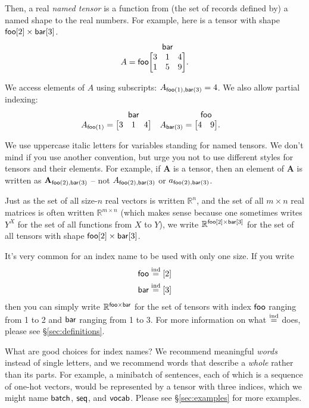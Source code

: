 \documentclass{article}
\makeatletter
\newcommand{\nmatrix}[3]{\name{#1}\begin{array}[b]{@{}c@{}}\name{#2}\\\begin{bmatrix}#3\end{bmatrix}\end{array}}
\makeatother
\begin{document}
Then, a real \emph{named tensor} is a function from (the set of records defined by) a named shape to the real numbers. For example, here is a tensor with shape $\mathsf{foo}[2] \times \mathsf{bar}[3]$.
\begin{equation*}
A = \nmatrix{foo}{bar}{
  3 & 1 & 4 \\
  1 & 5 & 9
}.
\end{equation*}

We access elements of $A$ using subscripts: $A_{\mathsf{foo}(1), \mathsf{bar}(3)} = 4$.
We also allow partial indexing:
\begin{align*}
A_{\nidx{foo}{1}} &= \nmatrix{}{bar}{
  3 & 1 & 4
}
&
A_{\nidx{bar}{3}} &= \nmatrix{}{foo}{
  4 & 9
}.
\end{align*}

We use uppercase italic letters for variables standing for named tensors. We don't mind if you use another convention, but urge you not to use different styles for tensors and their elements. For example, if $\mathbf{A}$ is a tensor, then an element of $\mathbf{A}$ is written as $\mathbf{A}_{\mathsf{foo}(2), \mathsf{bar}(3)}$ -- 
not $A_{\mathsf{foo}(2),\mathsf{bar}(3)}$ or $a_{\mathsf{foo}(2),\mathsf{bar}(3)}$.

Just as the set of all size-$n$ real vectors is written $\mathbb{R}^n$, and the set of all $m\times n$ real matrices is often written $\mathbb{R}^{m \times n}$ (which makes sense because one sometimes writes $Y^X$ for the set of all functions from $X$ to $Y$), we write $\mathbb{R}^{\mathsf{foo}[2] \times \mathsf{bar}[3]}$ for the set of all tensors with shape $\mathsf{foo}[2] \times \mathsf{bar}[3]$.

It's very common for an index name to be used with only one size. If you write
\begin{align*}
\mathsf{foo} &\overset{\textrm{ind}}= [2] \\
\mathsf{bar} &\overset{\textrm{ind}}= [3]
\end{align*}
then you can simply write $\mathbb{R}^{\mathsf{foo} \times \mathsf{bar}}$ for the set of tensors with index $\mathsf{foo}$ ranging from 1 to 2 and $\mathsf{bar}$ ranging from 1 to 3. For more information on what $\overset{\textrm{ind}}=$ does, please see \S\ref{sec:definitions}.

What are good choices for index names? We recommend meaningful \emph{words} instead of single letters, and we recommend words that describe a \emph{whole} rather than its parts. For example, a minibatch of sentences, each of which is a sequence of one-hot vectors, would be represented by a tensor with three indices, which we might name $\mathsf{batch}$, $\mathsf{seq}$, and $\mathsf{vocab}$. Please see \S\ref{sec:examples} for more examples.
\end{document}
